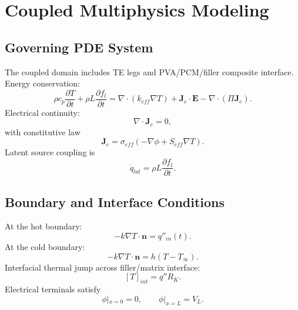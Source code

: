 \chapter{Coupled Multiphysics Modeling}\label{ch:multi}

\section{Governing PDE System}
The coupled domain includes TE legs and PVA/PCM/filler composite interface. Energy conservation:
\begin{equation}\label{eq:energy_coupled}
\rho c_p\frac{\partial T}{\partial t}+\rho L\frac{\partial f_l}{\partial t}=\nabla\cdot(k_{eff}\nabla T)+\mathbf{J}_e\cdot\mathbf{E}-\nabla\cdot(\Pi\mathbf{J}_e).
\end{equation}
Electrical continuity:
\begin{equation}\label{eq:charge_cont}
\nabla\cdot\mathbf{J}_e=0,
\end{equation}
with constitutive law
\begin{equation}\label{eq:constitutive_e}
\mathbf{J}_e=\sigma_{eff}\left(-\nabla\phi+S_{eff}\nabla T\right).
\end{equation}
Latent source coupling is
\begin{equation}\label{eq:latent_source}
\dot{q}_{lat}=\rho L\frac{\partial f_l}{\partial t}.
\end{equation}

\section{Boundary and Interface Conditions}
At the hot boundary:
\begin{equation}\label{eq:bc_hot}
-k\nabla T\cdot\mathbf{n}=q''_{in}(t).
\end{equation}
At the cold boundary:
\begin{equation}\label{eq:bc_cold}
-k\nabla T\cdot\mathbf{n}=h\left(T-T_\infty\right).
\end{equation}
Interfacial thermal jump across filler/matrix interface:
\begin{equation}\label{eq:bc_kapitza}
\left[T\right]_{int}=q''R_K.
\end{equation}
Electrical terminals satisfy
\begin{equation}\label{eq:bc_electrode}
\phi|_{x=0}=0,\qquad \phi|_{x=L}=V_L.
\end{equation}

